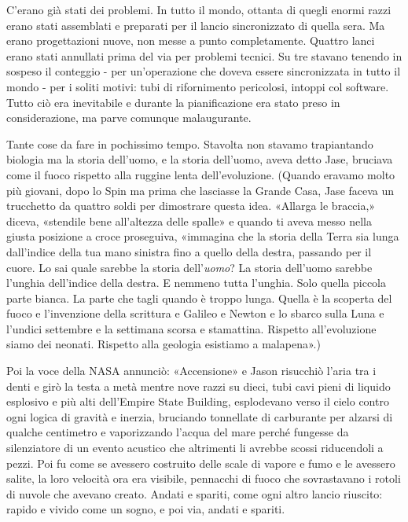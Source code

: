 C'erano già stati dei problemi. In tutto il mondo, ottanta di quegli
enormi razzi erano stati assemblati e preparati per il lancio
sincronizzato di quella sera. Ma erano progettazioni nuove, non messe a
punto completamente. Quattro lanci erano stati annullati prima del via
per problemi tecnici. Su tre stavano tenendo in sospeso il conteggio -
per un'operazione che doveva essere sincronizzata in tutto il mondo -
per i soliti motivi: tubi di rifornimento pericolosi, intoppi col
software. Tutto ciò era inevitabile e durante la pianificazione era
stato preso in considerazione, ma parve comunque malaugurante.

Tante cose da fare in pochissimo tempo. Stavolta non stavamo
trapiantando biologia ma la storia dell'uomo, e la storia dell'uomo,
aveva detto Jase, bruciava come il fuoco rispetto alla ruggine lenta
dell'evoluzione. (Quando eravamo molto più giovani, dopo lo Spin ma
prima che lasciasse la Grande Casa, Jase faceva un trucchetto da quattro
soldi per dimostrare questa idea. «Allarga le braccia,» diceva,
«stendile bene all'altezza delle spalle» e quando ti aveva messo nella
giusta posizione a croce proseguiva, «immagina che la storia della Terra
sia lunga dall'indice della tua mano sinistra fino a quello della
destra, passando per il cuore. Lo sai quale sarebbe la storia
dell'\emph{uomo}? La storia dell'uomo sarebbe l'unghia dell'indice della
destra. E nemmeno tutta l'unghia. Solo quella piccola parte bianca. La
parte che tagli quando è troppo lunga. Quella è la scoperta del fuoco e
l'invenzione della scrittura e Galileo e Newton e lo sbarco sulla Luna e
l'undici settembre e la settimana scorsa e stamattina. Rispetto
all'evoluzione siamo dei neonati. Rispetto alla geologia esistiamo a
malapena».)

Poi la voce della NASA annunciò: «Accensione» e Jason risucchiò l'aria
tra i denti e girò la testa a metà mentre nove razzi su dieci, tubi cavi
pieni di liquido esplosivo e più alti dell'Empire State Building,
esplodevano verso il cielo contro ogni logica di gravità e inerzia,
bruciando tonnellate di carburante per alzarsi di qualche centimetro e
vaporizzando l'acqua del mare perché fungesse da silenziatore di un
evento acustico che altrimenti li avrebbe scossi riducendoli a pezzi.
Poi fu come se avessero costruito delle scale di vapore e fumo e le
avessero salite, la loro velocità ora era visibile, pennacchi di fuoco
che sovrastavano i rotoli di nuvole che avevano creato. Andati e
spariti, come ogni altro lancio riuscito: rapido e vivido come un sogno,
e poi via, andati e spariti.

